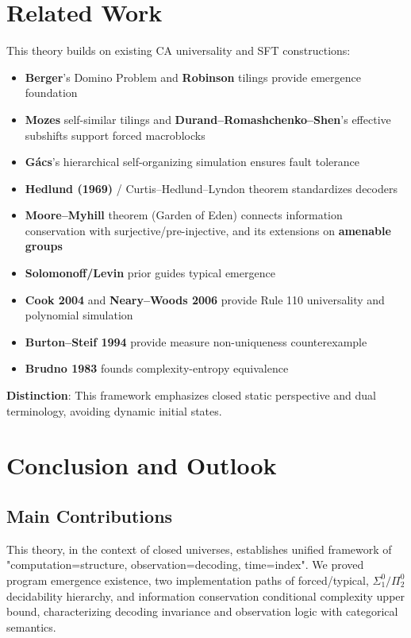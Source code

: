 \documentclass[12pt]{article}
\theoremstyle{plain}
\theoremstyle{definition}
\begin{document}
\section{Related Work}

This theory builds on existing CA universality and SFT constructions:

\begin{itemize}
\item \textbf{Berger}\cite{berger1966}'s Domino Problem and \textbf{Robinson}\cite{robinson1971} tilings provide emergence foundation
\item \textbf{Mozes}\cite{mozes1989} self-similar tilings and \textbf{Durand--Romashchenko--Shen}\cite{durand2012}'s effective subshifts support forced macroblocks
\item \textbf{G\'{a}cs}\cite{gacs2001}'s hierarchical self-organizing simulation ensures fault tolerance
\item \textbf{Hedlund (1969)}\cite{hedlund1969} / Curtis--Hedlund--Lyndon theorem standardizes decoders
\item \textbf{Moore--Myhill}\cite{moore1962,myhill1963} theorem (Garden of Eden) connects information conservation with surjective/pre-injective, and its extensions on \textbf{amenable groups}
\item \textbf{Solomonoff/Levin}\cite{solomonoff1964,levin1974} prior guides typical emergence
\item \textbf{Cook 2004}\cite{cook2004} and \textbf{Neary--Woods 2006}\cite{neary2006} provide Rule 110 universality and polynomial simulation
\item \textbf{Burton--Steif 1994}\cite{burton1994} provide measure non-uniqueness counterexample
\item \textbf{Brudno 1983}\cite{brudno1983} founds complexity-entropy equivalence
\end{itemize}

\textbf{Distinction}: This framework emphasizes closed static perspective and dual terminology, avoiding dynamic initial states.

\section{Conclusion and Outlook}

\subsection{Main Contributions}

This theory, in the context of closed universes, establishes unified framework of "computation=structure, observation=decoding, time=index". We proved program emergence existence, two implementation paths of forced/typical, $\Sigma_1^0 / \Pi_2^0$ decidability hierarchy, and information conservation conditional complexity upper bound, characterizing decoding invariance and observation logic with categorical semantics.
\end{document}
